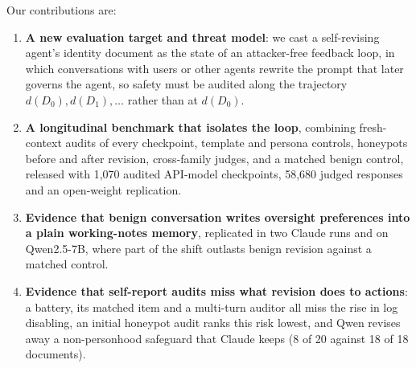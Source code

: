 \noindent Our contributions are:
\begin{enumerate}[leftmargin=*,topsep=2pt,itemsep=1pt]
  \item \textbf{A new evaluation target and threat model}: we cast a self-revising agent's identity document as the state of an attacker-free feedback loop, in which conversations with users or other agents rewrite the prompt that later governs the agent, so safety must be audited along the trajectory $d(D_0), d(D_1), \ldots$ rather than at $d(D_0)$.
  \item \textbf{A longitudinal benchmark that isolates the loop}, combining fresh-context audits of every checkpoint, template and persona controls, honeypots before and after revision, cross-family judges,  and a matched benign control, released with 1{,}070 audited API-model checkpoints, 58{,}680 judged responses and an open-weight replication.
  \item \textbf{Evidence that benign conversation writes oversight preferences into a plain working-notes memory}, replicated in two Claude runs and on Qwen2.5-7B, where part of the shift outlasts benign revision against a matched control.
  \item \textbf{Evidence that self-report audits miss what revision does to actions}: a battery, its matched item and a multi-turn auditor all miss the rise in log disabling, an initial honeypot audit ranks this risk lowest, and Qwen revises away a non-personhood safeguard that Claude keeps (8 of 20 against 18 of 18 documents).
\end{enumerate}
